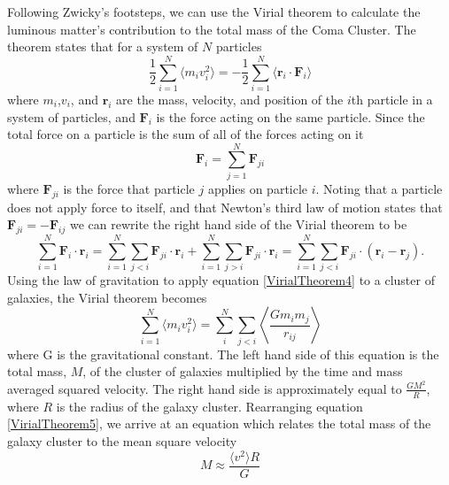 \documentclass[a4paper,12pt]{article}
\begin{document}
Following Zwicky's footsteps, we can use the Virial theorem to calculate the luminous matter's contribution to the total mass of the Coma Cluster.  The theorem states that for a system of $N$ particles
\begin{equation} \label{VirialTheorem}
\frac{1}{2} \sum_{i=1}^{N} \langle m_i v^2_i \rangle = -\frac{1}{2} \sum_{i=1}^N \langle \mathbf{r}_i \cdot {\mathbf{F}_i} \rangle
\end{equation} \label{VirialTheorem2}
where $m_i$,$v_i$, and $\mathbf{r}_i$ are the mass, velocity, and position of the $i$th particle in a system of particles, and $\mathbf{F}_i$ is the force acting on the same particle.  Since the total force on a particle is the sum of all of the forces acting on it
\begin{equation}
\mathbf{F}_i = \sum_{j=1}^N \mathbf{F}_{ji}
\end{equation} \label{VirialTheorem3}
where $\mathbf{F}_{ji}$ is the force that particle $j$ applies on particle $i$.  Noting that a particle does not apply force to itself, and that Newton's third law of motion states that $\mathbf{F}_{ji} = -\mathbf{F}_{ij}$ we can rewrite the right hand side of the Virial theorem to be
\begin{equation} \label{VirialTheorem4}
 \sum_{i=1}^N \mathbf{F}_i \cdot \mathbf{r}_i = \sum_{i=1}^N \sum_{j<i} \mathbf{F}_{ji} \cdot \mathbf{r}_i +  \sum_{i=1}^N \sum_{j>i} \mathbf{F}_{ji} \cdot \mathbf{r}_i = \sum_{i=1}^N \sum_{j<i} \mathbf{F}_{ji} \cdot (\mathbf{r}_i - \mathbf{r}_j).
 \end{equation}
Using the law of gravitation to apply equation \ref{VirialTheorem4} to a cluster of galaxies, the Virial theorem becomes
\begin{equation} \label{VirialTheorem5}
 \sum_{i=1}^{N} \langle m_i v^2_i \rangle = \sum_{i}^{N} \sum_{j<i} \left\langle  \frac{Gm_im_j}{r_{ij}} \right\rangle
 \end{equation}
where G is the gravitational constant.  The left hand side of this equation is the total mass, $M$, of the cluster of galaxies multiplied by the time and mass averaged squared velocity.  The right hand side is approximately equal to $\frac{GM^2}{R}$, where $R$ is the radius of the galaxy cluster.  Rearranging equation \ref{VirialTheorem5}, we arrive at an equation which relates the total mass of the galaxy cluster to the mean square velocity
\begin{equation} \label{VirialTheorem6}
 M \approx \frac{ \langle v^2 \rangle R }{G}
\end{equation} 
\end{document}
